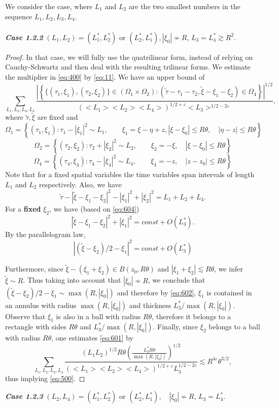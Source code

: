 \documentclass[draft,11pt,leqno]{amsart}
\newcommand{\q}{\quad}
\newcommand{\qq}{\quad\quad}
\newcommand{\ve}{\varepsilon}
\newcommand{\Om}{\Omega}
\newcommand{\suml}{\sum\limits}
\newcommand{\f}{\displaystyle\frac}
\newcommand{\lone}{{L_1^{*}}}
\newcommand{\ltwo}{{L_2^{*}}}
\newcommand{\lthree}{{L_3^{*}}}
\newcommand{\lfour}{{L_4^{*}}}
\begin{document}
We consider the case, where $L_1$ and $L_2$ are the two smallest numbers in the sequence
$L_1, L_2, L_3, L_4$.\\ \\
{\it\bf Case 1.2.2} $(L_1,L_2)=(\lone,\ltwo)$ or 
$(\ltwo,\lone), |\xi_0|\nsim R $, $L_3=\lfour\gtrsim R^2$.
\begin{proof}
In that case, we will fully use the quatrilinear form, instead of
relying on Cauchy-Schwartz and then deal with the resulting
trilinear forms. We estimate the multiplier in \eqref{eq:400} by
\eqref{eq:11}. We have an upper bound of 
\begin{equation}
\label{eq:601}
 \suml_{L_1,L_2,L_3,L_4}\f{\left|
\left\{\{(\tau_1,\xi_1),(\tau_2,\xi_2)\}\in(\Om_1\times\Om_2):(\tilde{\tau}-\tau_1-\tau_2,
\tilde{\xi}-\xi_1-\xi_2)\in
\Om_4\right\}\right|^{1/2}}{(<L_1><L_2><L_4>)^{1/2+\ve}<L_3>^{1/2-2\ve}},
\end{equation}
where $\tilde{\tau},\tilde{\xi}$ are fixed and $$\Om_1=\left\{
(\tau_1,\xi_1):\tau_1-|\xi_1|^2\sim L_1,\qq \xi_1=\xi-\eta+z,
|\xi-\xi_0|\leq R\theta,\q |\eta-z|\leq R\theta \right\} $$
$$\Om_2=\left\{ (\tau_2,\xi_2):\tau_2+|\xi_2|^2\sim L_2,\qq
\xi_2=-\xi,\q |\xi-\xi_0|\leq R\theta\right\} $$ $$\Om_4=\left\{
(\tau_4,\xi_4):\tau_4-|\xi_4|^2\sim L_4, \qq \xi_4=-z,\q
|z-z_0|\leq R\theta\right\} $$ Note that for a fixed spatial
variables the time variables span intervals of length $L_1$ and
$L_2$ respectively. Also, we have
\begin{equation}
\label{eq:604}
\tilde{\tau}-|\tilde{\xi}-\xi_1-\xi_2|^2-|\xi_1|^2+|\xi_2|^2=L_1+L_2+L_4.
\end{equation}
For a {\bf fixed} $\xi_2$, we have (based on \eqref{eq:604})
$$
 |\tilde{\xi}-\xi_1-\xi_2|^2 +|\xi_1|^2=const
+O(\lthree).$$ By the parallelogram law,
\begin{equation}
\label{eq:602} |(\tilde{\xi}-\xi_2)/2-\xi_1|^2=const + O(\lthree)
\end{equation}

Furthermore, since $\tilde{\xi}-(\xi_1+\xi_2)\in B(z_0, R\theta)$
and $|\xi_1+\xi_2|\lesssim R\theta$, we infer $\tilde{\xi}\sim R$.
Thus taking into account that $|\xi_0|\nsim R$, we conclude that
$(\tilde{\xi}-\xi_2)/2-\xi_1\sim \max(R,|\xi_0|)$ and therefore by
\eqref{eq:602}, $\xi_1$ is contained in an annulus with radius
$\max(R,|\xi_0|)$ and thickness $\lthree/\max(R,|\xi_0|)$. Observe
that $\xi_1$ is also in a ball with radius $R\theta$,
therefore it belongs to a rectangle with sides $R\theta$ and
$\lthree/\max(R,|\xi_0|)$. Finally, since $\xi_2$ belongs to a
ball with radius $R\theta$, one estimates \eqref{eq:601} by $$
\suml_{L_1,L_2, L_3, L_4}\f{(L_1 L_2)^{1/2}R\theta
\left(\f{\lthree
R\theta}{\max(R,|\xi_0|)}\right)^{1/2}}{(<L_1><L_2><L_4>)^{1/2+\ve}L_3^{1/2-2\ve}}
\lesssim R^{4\ve}\theta^{3/2}, $$
thus implying \eqref{eq:500}.
\end{proof}
{\it\bf Case 1.2.3} $(L_2,L_4)=(\lone,\ltwo)$ or 
$(\ltwo,\lone),\q |\xi_0|\nsim R$, $L_3=\lfour$.
\end{document}

